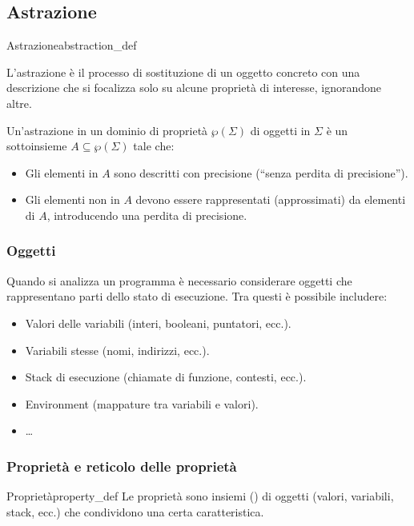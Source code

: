 \subsection{Astrazione}

\begin{definizione}{Astrazione}{abstraction_def}

L'astrazione è il processo di sostituzione di un oggetto concreto con una
descrizione che si focalizza solo su alcune proprietà di interesse,
ignorandone altre.


Un'astrazione in un dominio di proprietà $\wp(\Sigma)$ di oggetti in $\Sigma$
è un sottoinsieme $A \subseteq \wp(\Sigma)$ tale che:
\begin{itemize}
    \item Gli elementi in $A$ sono descritti con precisione (``senza perdita di precisione'').
    \item Gli elementi non in $A$ devono essere rappresentati (approssimati)
    da elementi di $A$, introducendo una perdita di precisione.
\end{itemize}

\end{definizione}


\subsubsection{Oggetti}

Quando si analizza un programma è necessario considerare oggetti che rappresentano
parti dello stato di esecuzione. Tra questi è possibile includere:
\begin{itemize}
    \item Valori delle variabili (interi, booleani, puntatori, ecc.).
    \item Variabili stesse (nomi, indirizzi, ecc.).
    \item Stack di esecuzione (chiamate di funzione, contesti, ecc.).
    \item Environment (mappature tra variabili e valori).
    \item \ldots
\end{itemize}

\subsubsection{Proprietà e reticolo delle proprietà}

\begin{definizione}{Proprietà}{property_def}
Le proprietà sono insiemi () di oggetti (valori, variabili, stack, ecc.)
che condividono una certa caratteristica.
\end{definizione}

